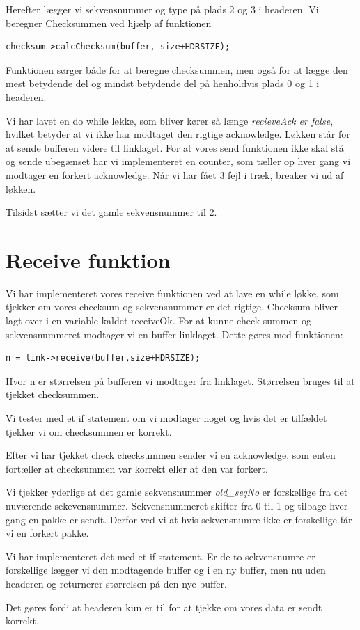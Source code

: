 Herefter lægger vi sekvensnummer og type på plads 2 og 3 i headeren. 
Vi beregner Checksummen ved hjælp af funktionen 
\begin{lstlisting}
checksum->calcChecksum(buffer, size+HDRSIZE);
\end{lstlisting}
Funktionen sørger både for at beregne checksummen, men også for at lægge den mest betydende del og mindst betydende del på henholdvis plads 0 og 1 i headeren.

Vi har lavet en do while løkke, som bliver kører så længe \textit{recieveAck er false}, hvilket betyder at vi ikke har modtaget den rigtige acknowledge. Løkken står for at sende bufferen videre til linklaget. 
For at vores send funktionen ikke skal stå og sende ubegænset har vi implementeret en counter, som tæller op hver gang vi modtager en forkert acknowledge. Når vi har fået 3 fejl i træk, breaker vi ud af løkken. 

Tilsidst sætter vi det gamle sekvensnummer til 2.

\section{Receive funktion}

Vi har implementeret vores receive funktionen ved at lave en while løkke, som tjekker om vores checksum og sekvensnummer er det rigtige. 
Checksum bliver lagt over i en variable kaldet receiveOk. 
For at kunne check summen og sekvensnummeret modtager vi en buffer linklaget. 
Dette gøres med funktionen: 
\begin{lstlisting}
n = link->receive(buffer,size+HDRSIZE);
\end{lstlisting}
Hvor n er størrelsen på bufferen vi modtager fra linklaget. Størrelsen bruges til at tjekket checksummen. 

Vi tester med et if statement om vi modtager noget og hvis det er tilfældet tjekker vi om checksummen er korrekt. 

Efter vi har tjekket check checksummen sender vi en acknowledge, som enten fortæller at checksummen var korrekt eller at den var forkert. 

Vi tjekker yderlige at det gamle sekvensnummer \textit{old\_seqNo} er forskellige fra det nuværende sekevensnummer. Sekvensnummeret skifter fra 0 til 1 og tilbage hver gang en pakke er sendt. Derfor ved vi at hvis sekvensnumre ikke er forskellige får vi en forkert pakke.  

Vi har implementeret det med et if statement. 
Er de to sekvensnumre er forskellige lægger vi den modtagende buffer og i en ny buffer, men nu uden headeren og returnerer størrelsen på den nye buffer.

Det gøres fordi at headeren kun er til for at tjekke om vores data er sendt korrekt.  
